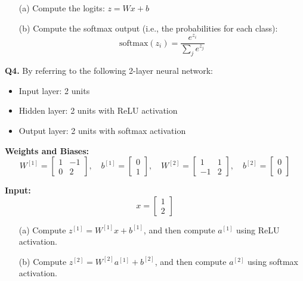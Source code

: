 \documentclass{article}
\begin{document}
\begin{itemize}
    \item[(a)] Compute the logits: \( z = Wx + b \)
    \item[(b)] Compute the softmax output (i.e., the probabilities for each class):
    \[
    \text{softmax}(z_i) = \frac{e^{z_i}}{\sum_{j} e^{z_j}}
    \]
\end{itemize}

\vspace{1\baselineskip}

\textbf{Q4.} By referring to the following 2-layer neural network:

\begin{itemize}
    \item Input layer: 2 units
    \item Hidden layer: 2 units with ReLU activation
    \item Output layer: 2 units with softmax activation
\end{itemize}

\textbf{Weights and Biases:}
\[
W^{[1]} = 
\begin{bmatrix}
1 & -1 \\
0 & 2
\end{bmatrix}, \quad
b^{[1]} = 
\begin{bmatrix}
0 \\
1
\end{bmatrix}, \quad
W^{[2]} = 
\begin{bmatrix}
1 & 1 \\
-1 & 2
\end{bmatrix}, \quad
b^{[2]} = 
\begin{bmatrix}
0 \\
0
\end{bmatrix}
\]

\textbf{Input:}
\[
x = 
\begin{bmatrix}
1 \\
2
\end{bmatrix}
\]

\begin{itemize}
    \item[(a)] Compute \( z^{[1]} = W^{[1]} x + b^{[1]} \), and then compute \( a^{[1]} \) using ReLU activation.
    
    \item[(b)] Compute \( z^{[2]} = W^{[2]} a^{[1]} + b^{[2]} \), and then compute \( a^{[2]} \) using softmax activation.
\end{itemize}
\vspace{1\baselineskip}
\end{document}
